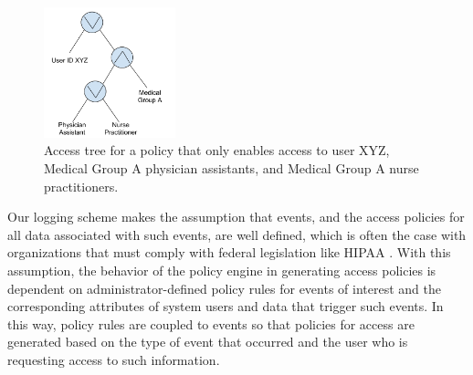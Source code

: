 \documentclass{sig-alternate}
\begin{document}
\begin{figure}[ht!]
\begin{center}
\includegraphics[width=1.5in]{images/cpabePolicy.pdf}
\caption{Access tree for a policy that only enables access to user XYZ, Medical Group A physician assistants, and Medical Group A nurse practitioners.}
\label{fig:accessTree}
\end{center}
\end{figure}

Our logging scheme makes the assumption that events, and the access policies for all data associated
with such events, are well defined, which is often the case with organizations that must
comply with federal legislation like HIPAA \cite{annas2003hipaa}. With this
assumption, the behavior of the policy engine in generating access policies is dependent on
administrator-defined policy rules for events of interest and the corresponding attributes of
system users and data that trigger such events. In this way, policy rules are coupled to events so that 
policies for access are generated based on the type of event that occurred and the user who is requesting 
access to such information. 
\end{document}
